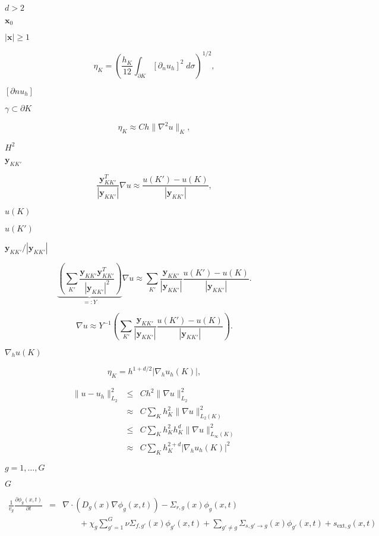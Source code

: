 \documentclass{article}
\begin{document}
$d>2$
\pagebreak

${\mathbf x}_0$
\pagebreak

$|{\mathbf x}|\ge 1$
\pagebreak

\[ \eta_K = \left( \frac {h_K}{12} \int_{\partial K} [\partial_n u_h]^2 \; d\sigma \right)^{1/2}, \]
\pagebreak

$[\partial n u_h]$
\pagebreak

$\gamma\subset\partial K$
\pagebreak

\[ \eta_K \approx C h \| \nabla^2 u \|_K, \]
\pagebreak

$H^2$
\pagebreak

${\mathbf y}_{KK'}$
\pagebreak

\[ \frac{{\mathbf y}_{KK'}^T}{|{\mathbf y}_{KK'}|} \nabla u \approx \frac{u(K') - u(K)}{|{\mathbf y}_{KK'}|}, \]
\pagebreak

$u(K)$
\pagebreak

$u(K')$
\pagebreak

${\mathbf y}_{KK'}/|{\mathbf y}_{KK'}|$
\pagebreak

\[ \underbrace{ \left(\sum_{K'} \frac{{\mathbf y}_{KK'} {\mathbf y}_{KK'}^T} {|{\mathbf y}_{KK'}|^2}\right)}_{=:Y} \nabla u \approx \sum_{K'} \frac{{\mathbf y}_{KK'}}{|{\mathbf y}_{KK'}|} \frac{u(K') - u(K)}{|{\mathbf y}_{KK'}|}. \]
\pagebreak

\[ \nabla u \approx Y^{-1} \left( \sum_{K'} \frac{{\mathbf y}_{KK'}}{|{\mathbf y}_{KK'}|} \frac{u(K') - u(K)}{|{\mathbf y}_{KK'}|} \right). \]
\pagebreak

$\nabla_h u(K)$
\pagebreak

\[ \eta_K = h^{1+d/2} |\nabla_h u_h(K)|, \]
\pagebreak

\begin{eqnarray*} \|u-u_h\|^2_{L_2} &\le& C h^2 \|\nabla u\|^2_{L_2} \\ &\approx& C \sum_K h_K^2 \|\nabla u\|^2_{L_2(K)} \\ &\le& C \sum_K h_K^2 h_K^d \|\nabla u\|^2_{L_\infty(K)} \\ &\approx& C \sum_K h_K^{2+d} |\nabla_h u_h(K)|^2 \end{eqnarray*}
\pagebreak

$g=1,\ldots,G$
\pagebreak

$G$
\pagebreak

\begin{eqnarray*} \frac 1{v_g}\frac{\partial \phi_g(x,t)}{\partial t} &=& \nabla \cdot(D_g(x) \nabla \phi_g(x,t)) - \Sigma_{r,g}(x)\phi_g(x,t) \\ && \qquad + \chi_g\sum_{g'=1}^G\nu\Sigma_{f,g'}(x)\phi_{g'}(x,t) + \sum_{g'\ne g}\Sigma_{s,g'\to g}(x)\phi_{g'}(x,t) + s_{\mathrm{ext},g}(x,t) \end{eqnarray*}
\pagebreak
\end{document}
